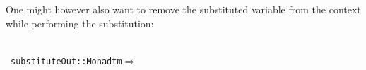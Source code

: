 \documentclass[9pt,preprint,authoryear]{sigplanconf}
\begin{document}
%
One might however also want to remove the substituted
    variable from the context while performing the substitution{:}%


{\nopagebreak }

%
%
%
~\\~\vphantom{$\{$}\textcolor[rgb]{0,0,0.80}{\texttt{substituteOut}}\textcolor[rgb]{0,0,0.80}{\texttt{\mbox{\hspace{0.50em}}}}\textcolor[cmyk]{0,0.65,0.99,0}{\texttt{{:}{:}}}\textcolor[rgb]{0,0,0.80}{\texttt{\mbox{\hspace{0.50em}}}}\textcolor[rgb]{0,0,0.80}{\texttt{Monad}}\textcolor[rgb]{0,0,0.80}{\texttt{\mbox{\hspace{0.50em}}}}\textcolor[rgb]{0,0,0.80}{\texttt{tm}}\textcolor[rgb]{0,0,0.80}{\texttt{\mbox{\hspace{0.50em}}}}\textcolor[cmyk]{0,0.65,0.99,0}{\texttt{$ \Rightarrow $}}\textcolor[rgb]{0,0,0.80}{\texttt{{\nopagebreak \newline%
}}}
\end{document}
